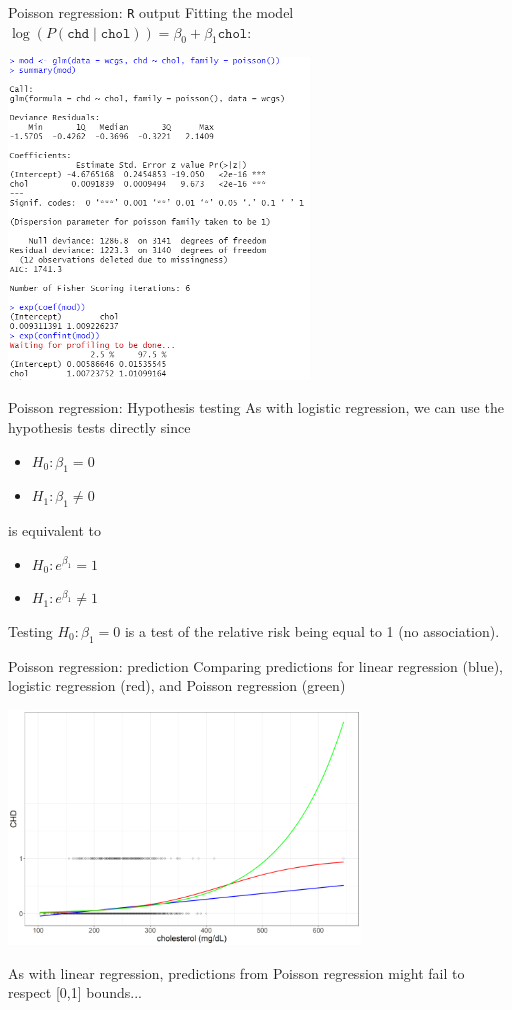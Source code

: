 \documentclass[10pt,t]{beamer}
\begin{document}
\begin{frame}{Poisson regression: \texttt{R} output}
	\vspace{-0.6cm}
	Fitting the model $\log(P(\texttt{chd} \mid \texttt{chol})) = \beta_0 + \beta_1 \texttt{chol}$:
		\begin{center}
		\includegraphics[width=0.6\textwidth]{./figs/simple_poisson_regression}
	\end{center}
\end{frame}

\begin{frame}{Poisson regression: Hypothesis testing}
	As with logistic regression, we can use the hypothesis tests directly since 
	\begin{itemize}
		\item $H_0: \beta_1 = 0$
		\item $H_1: \beta_1 \neq 0$
	\end{itemize}
	is equivalent to 
	\begin{itemize}
		\item $H_0: e^{\beta_1} = 1$
		\item $H_1: e^{\beta_1} \neq 1$
	\end{itemize}
	Testing $H_0: \beta_1 = 0$ is a test of the relative risk being equal to 1 (no association).
\end{frame}

\begin{frame}{Poisson regression: prediction}
	Comparing predictions for linear regression (blue), logistic regression (red), and Poisson regression (green)
	\begin{center}
		\includegraphics[width=0.7\textwidth]{./figs/scatter_glm2}
	\end{center}
	As with linear regression, predictions from Poisson regression might fail to respect [0,1] bounds...
\end{frame}
\end{document}
